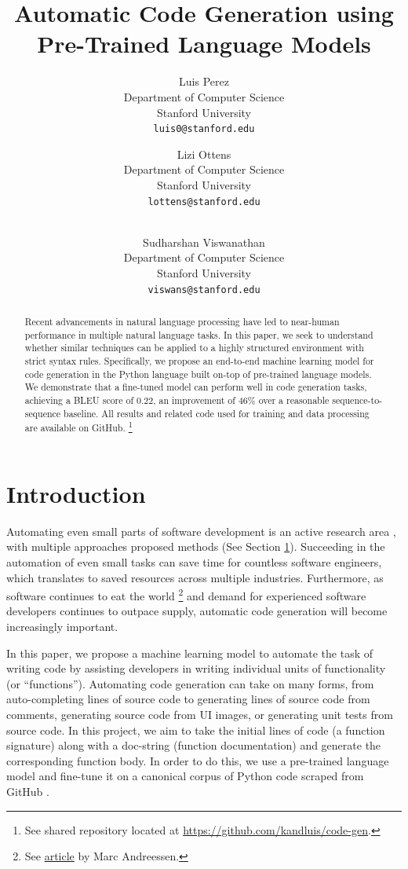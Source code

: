 \documentclass[10pt,twocolumn]{article}
\title{Automatic Code Generation using Pre-Trained Language Models}
\author{

  Luis Perez \\
  Department of Computer Science \\
  Stanford University \\
  \texttt{luis0@stanford.edu}
  
  \and
  Lizi Ottens  \\
  Department of Computer Science\\
  Stanford University\\
  \texttt{lottens@stanford.edu}
  
  \and
  
  \\
  Sudharshan Viswanathan \\
  Department of Computer Science \\
  Stanford University \\
  \texttt{viswans@stanford.edu}
}
\begin{document}
\maketitle

\begin{abstract}
 Recent advancements in natural language processing \cite{gpt2} \cite{BERT} have led to near-human performance in multiple natural language tasks. In this paper, we seek to understand whether similar techniques can be applied to a highly structured environment with strict syntax rules. Specifically, we propose an end-to-end machine learning model for code generation in the Python language built on-top of pre-trained language models. We demonstrate that a fine-tuned model can perform  well in code generation tasks, achieving a BLEU score of 0.22, an improvement of 46\% over a reasonable sequence-to-sequence baseline. All results and related code used for training and data processing are available on GitHub. \footnote{See shared repository located at \href{https://github.com/kandluis/code-gen}{https://github.com/kandluis/code-gen}.}
\end{abstract}

\section{Introduction}
\label{sec:introduction}
Automating even small parts of software development is an active research area \cite{survey}, with multiple approaches proposed  methods (See Section \ref{sec:introduction}). Succeeding in the automation of even small tasks can save time for countless software engineers, which translates to saved resources across multiple industries. Furthermore, as software continues to eat the world \footnote{See \href{https://www.wsj.com/articles/SB10001424053111903480904576512250915629460}{article} by Marc Andreessen.} and demand for experienced software developers continues to outpace supply, automatic code generation will become increasingly important.

In this paper, we propose a machine learning model to automate the task of writing code by assisting developers in writing individual units of functionality (or ``functions''). Automating code generation can take on many forms, from auto-completing lines of source code to generating lines of source code from comments, generating source code from UI images, or generating unit tests from source code. In this project, we aim to take the initial lines of code (a function signature) along with a doc-string (function documentation) and generate the corresponding function body. In order to do this, we use a pre-trained language model and fine-tune it on a canonical corpus of Python code scraped from GitHub \cite{codesearchnet}.
\end{document}
